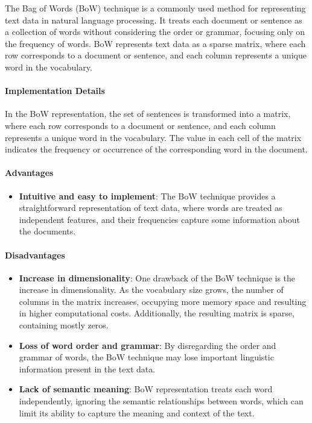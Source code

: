 \documentclass{article}
\begin{document}
The Bag of Words (BoW) technique is a commonly used method for representing text data in natural language processing. It treats each document or sentence as a collection of words without considering the order or grammar, focusing only on the frequency of words. BoW represents text data as a sparse matrix, where each row corresponds to a document or sentence, and each column represents a unique word in the vocabulary.

\paragraph{Implementation Details}

In the BoW representation, the set of sentences is transformed into a matrix, where each row corresponds to a document or sentence, and each column represents a unique word in the vocabulary. The value in each cell of the matrix indicates the frequency or occurrence of the corresponding word in the document.

\paragraph{Advantages}

\begin{itemize}
\item \textbf{Intuitive and easy to implement}: The BoW technique provides a straightforward representation of text data, where words are treated as independent features, and their frequencies capture some information about the documents.
\end{itemize}

\paragraph{Disadvantages}

\begin{itemize}
\item \textbf{Increase in dimensionality}: One drawback of the BoW technique is the increase in dimensionality. As the vocabulary size grows, the number of columns in the matrix increases, occupying more memory space and resulting in higher computational costs. Additionally, the resulting matrix is sparse, containing mostly zeros.
\item \textbf{Loss of word order and grammar}: By disregarding the order and grammar of words, the BoW technique may lose important linguistic information present in the text data.
\item \textbf{Lack of semantic meaning}: BoW representation treats each word independently, ignoring the semantic relationships between words, which can limit its ability to capture the meaning and context of the text.
\end{itemize}
\end{document}
